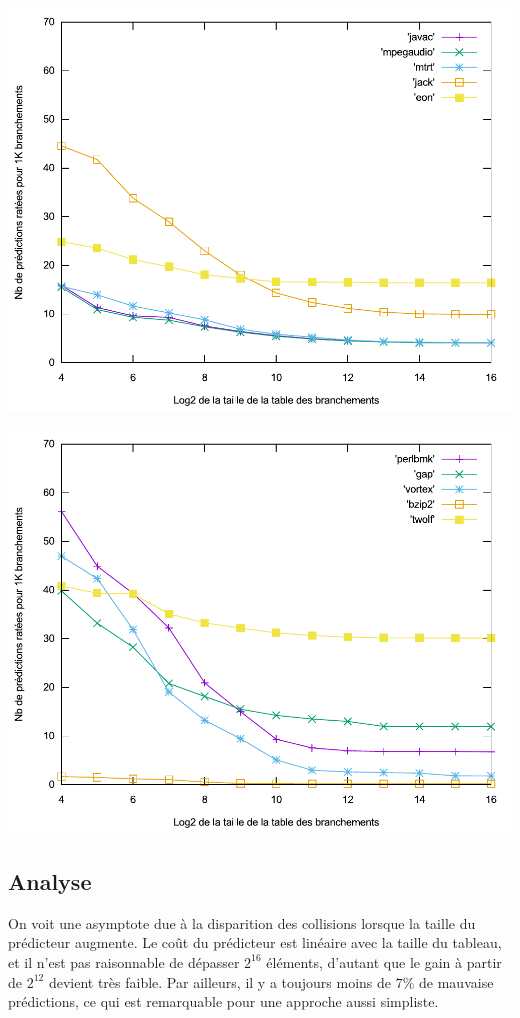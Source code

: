 \documentclass[a4paper]{article}
\begin{document}
\begin{minipage}{.48\linewidth}
\includegraphics[width=\linewidth]{1-bit-2}
\end{minipage}%
\hfill
\begin{minipage}{.48\linewidth}
\includegraphics[width=\linewidth]{1-bit-3}
\end{minipage}

\subsection{Analyse}
On voit une asymptote due à la disparition des collisions lorsque la taille du prédicteur augmente.
Le coût du prédicteur est linéaire avec la taille du tableau, et il n'est pas raisonnable de dépasser $2^{16}$ éléments, d'autant que le gain à partir de $2^{12}$ devient très faible.
Par ailleurs, il y a toujours moins de $7\%$ de mauvaise prédictions, ce qui est remarquable pour une approche aussi simpliste.
\end{document}
